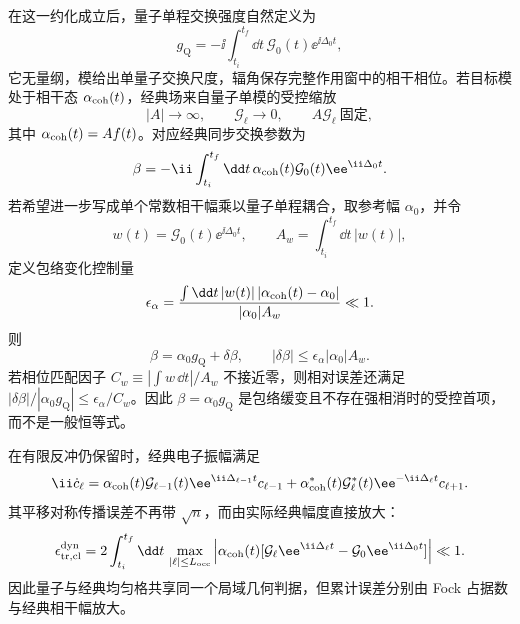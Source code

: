 在这一约化成立后，量子单程交换强度自然定义为
\begin{equation}
{
g_{\mathrm Q}=-\ii\int_{t_i}^{t_f}\dd t\,\mathcal G_0(t)\ee^{\ii\Delta_0t},}
\label{eq:single_pass_quantum_coupling_general}
\end{equation}
它无量纲，模给出单量子交换尺度，辐角保存完整作用窗中的相干相位。若目标模处于相干态 $\alpha_{\rm coh}(t)$，经典场来自量子单模的受控缩放
\begin{equation}
{
|A|\to\infty,
\qquad \mathcal G_\ell\to0,
\qquad A\mathcal G_\ell\ \text{固定},}
\label{eq:coherent_classical_limit}
\end{equation}
其中 $\alpha_{\rm coh}(t)=Af(t)$。对应经典同步交换参数为
\begin{equation}
{
\beta=-\ii\int_{t_i}^{t_f}\dd t\,
\alpha_{\rm coh}(t)\mathcal G_0(t)\ee^{\ii\Delta_0t}.}
\label{eq:classical_synchronous_coupling_from_quantum}
\end{equation}
若希望进一步写成单个常数相干幅乘以量子单程耦合，取参考幅 $\alpha_0$，并令
\begin{equation*}
 w(t)=\mathcal G_0(t)\ee^{\ii\Delta_0t},
 \qquad
 A_w=\int_{t_i}^{t_f}\dd t\,|w(t)|,
\end{equation*}
定义包络变化控制量
\begin{equation*}
 \epsilon_\alpha
 =\frac{\int\dd t\,|w(t)|\,|\alpha_{\rm coh}(t)-\alpha_0|}
 {|\alpha_0|A_w}\ll1.
\end{equation*}
则
\begin{equation*}
 \beta=\alpha_0g_{\mathrm Q}+\delta\beta,
 \qquad
 |\delta\beta|\le\epsilon_\alpha|\alpha_0|A_w.
\end{equation*}
若相位匹配因子 $C_w\equiv|\int w\,\dd t|/A_w$ 不接近零，则相对误差还满足 $|\delta\beta|/|\alpha_0g_{\mathrm Q}|\le\epsilon_\alpha/C_w$。因此 $\beta=\alpha_0g_{\mathrm Q}$ 是包络缓变且不存在强相消时的受控首项，而不是一般恒等式。

在有限反冲仍保留时，经典电子振幅满足
\begin{equation}
{
\ii\dot c_\ell
=\alpha_{\rm coh}(t)\mathcal G_{\ell-1}(t)\ee^{\ii\Delta_{\ell-1}t}c_{\ell-1}
+\alpha_{\rm coh}^*(t)\mathcal G_\ell^*(t)\ee^{-\ii\Delta_\ell t}c_{\ell+1}.}
\label{eq:classical_recoil_chain_from_master}
\end{equation}
其平移对称传播误差不再带 $\sqrt n$，而由实际经典幅度直接放大：
\begin{equation}
{
\epsilon_{\rm tr,cl}^{\rm dyn}
=2\int_{t_i}^{t_f}\dd t\,
\max_{|\ell|\le L_{\rm occ}}
\left|\alpha_{\rm coh}(t)
[\mathcal G_\ell\ee^{\ii\Delta_\ell t}-\mathcal G_0\ee^{\ii\Delta_0t}]
\right|\ll1.}
\label{eq:classical_translation_duhamel_error}
\end{equation}
因此量子与经典均匀格共享同一个局域几何判据，但累计误差分别由 Fock 占据数与经典相干幅放大。

